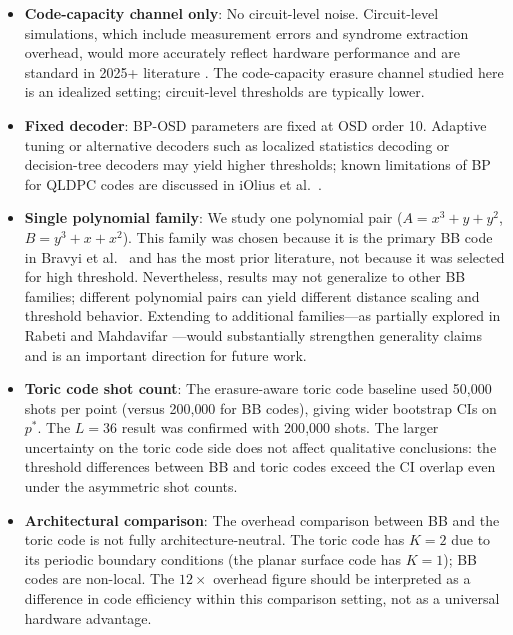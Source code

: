\documentclass[twocolumn,10pt]{article}
\begin{document}
\begin{itemize}
    \item \textbf{Code-capacity channel only}: No circuit-level noise. Circuit-level
          simulations, which include measurement errors and syndrome extraction overhead,
          would more accurately reflect hardware performance and are standard in 2025+
          literature \cite{berthusen2025local}. The code-capacity erasure channel studied
          here is an idealized setting; circuit-level thresholds are typically lower.
    \item \textbf{Fixed decoder}: BP-OSD parameters are fixed at OSD order 10. Adaptive
          tuning or alternative decoders such as localized statistics decoding
          \cite{hillmann2025lsd} or decision-tree decoders \cite{ott2025decision} may
          yield higher thresholds; known limitations of BP for QLDPC codes are discussed
          in iOlius et al.\ \cite{iolius2024bp}.
    \item \textbf{Single polynomial family}: We study one polynomial pair
          ($A = x^3 + y + y^2$, $B = y^3 + x + x^2$). This family was chosen because it
          is the primary BB code in Bravyi et al.\ \cite{bravyi2024high} and has the most
          prior literature, not because it was selected for high threshold.
          Nevertheless, results may not generalize to other BB families; different
          polynomial pairs can yield different distance scaling and threshold behavior.
          Extending to additional families---as partially explored in Rabeti and Mahdavifar
          \cite{rabeti2025bicycle}---would substantially strengthen generality claims
          and is an important direction for future work.
    \item \textbf{Toric code shot count}: The erasure-aware toric code baseline used 50{,}000
          shots per point (versus 200{,}000 for BB codes), giving wider bootstrap CIs on $p^*$.
          The $L=36$ result was confirmed with 200{,}000 shots.
          The larger uncertainty on the toric code side does not affect qualitative
          conclusions: the threshold differences between BB and toric codes exceed the CI
          overlap even under the asymmetric shot counts.
    \item \textbf{Architectural comparison}: The overhead comparison between BB and the toric
          code is not fully architecture-neutral. The toric code has $K=2$ due to its periodic
          boundary conditions (the planar surface code has $K=1$); BB codes are non-local.
          The $12\times$ overhead
          figure should be interpreted as a difference in code efficiency within this
          comparison setting, not as a universal hardware advantage.
\end{itemize}
\end{document}
